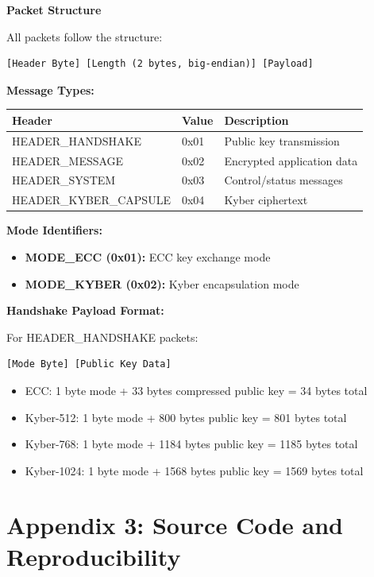 \textbf{Packet Structure}

All packets follow the structure:
\begin{verbatim}
[Header Byte] [Length (2 bytes, big-endian)] [Payload]
\end{verbatim}

\textbf{Message Types:}

\begin{table}[h]
\centering
\begin{tabular}{l|l|l}
\hline
\textbf{Header} & \textbf{Value} & \textbf{Description} \\ \hline
HEADER\_HANDSHAKE & 0x01 & Public key transmission \\
HEADER\_MESSAGE & 0x02 & Encrypted application data \\
HEADER\_SYSTEM & 0x03 & Control/status messages \\
HEADER\_KYBER\_CAPSULE & 0x04 & Kyber ciphertext \\ \hline
\end{tabular}
\end{table}

\textbf{Mode Identifiers:}

\begin{itemize}
\item \textbf{MODE\_ECC (0x01):} ECC key exchange mode
\item \textbf{MODE\_KYBER (0x02):} Kyber encapsulation mode
\end{itemize}

\textbf{Handshake Payload Format:}

For HEADER\_HANDSHAKE packets:
\begin{verbatim}
[Mode Byte] [Public Key Data]
\end{verbatim}

\begin{itemize}
\item ECC: 1 byte mode + 33 bytes compressed public key = 34 bytes total
\item Kyber-512: 1 byte mode + 800 bytes public key = 801 bytes total
\item Kyber-768: 1 byte mode + 1184 bytes public key = 1185 bytes total
\item Kyber-1024: 1 byte mode + 1568 bytes public key = 1569 bytes total
\end{itemize}

\section*{Appendix 3: Source Code and Reproducibility}

